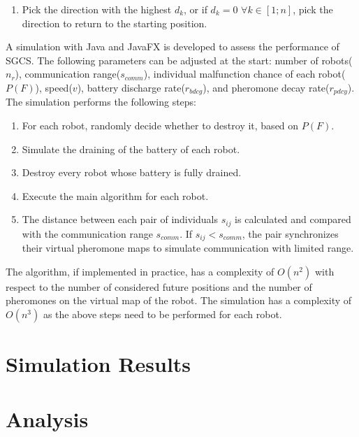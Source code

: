 \documentclass[a4paper, 12pt, times]{article}
\begin{document}
\begin{multicols}{2}
\begin{enumerate}
\begin{enumerate}
		\end{enumerate}
	\item Pick the direction with the highest $d_k$, or if $d_k=0$ $\forall k \in [1;n]$, pick the direction to return to the starting position.
	\end{enumerate}
A simulation with Java and JavaFX is developed to assess the performance of SGCS. The following parameters can be adjusted at the start: number of robots($n_r$), communication range($s_{comm}$), individual malfunction chance of each robot($P(F)$), speed($v$), battery discharge rate($r_{bdcg}$), and pheromone decay rate($r_{pdcy}$). 
The simulation performs the following steps:
\begin{enumerate}
	\item For each robot, randomly decide whether to destroy it, based on $P(F)$. 
	\item Simulate the draining of the battery of each robot.
	\item Destroy every robot whose battery is fully drained.
	\item Execute the main algorithm for each robot.
	\item The distance between each pair of individuals $s_{ij}$ is calculated and compared with the communication range $s_{comm}$. If $s_{ij}<s_{comm}$, the pair synchronizes their virtual pheromone maps to simulate communication with limited range.
\end{enumerate}
\par The algorithm, if implemented in practice, has a complexity of $O(n^2)$ with respect to the number of considered future positions and the number of pheromones on the virtual map of the robot. The simulation has a complexity of $O(n^3)$ as the above steps need to be performed for each robot.
\section{Simulation Results}
\section{Analysis}

\end{multicols}
\end{document}

